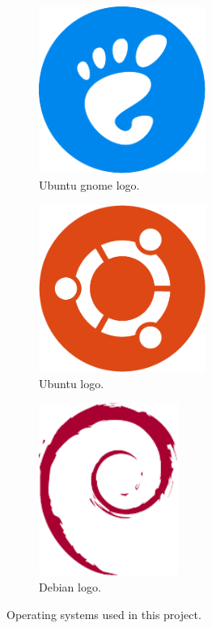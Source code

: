 \begin{figure}[!htbp]
	\centering
	\begin{subfigure}{0.3\textwidth}
		\centering
		\includegraphics[width=0.6\textwidth]{fig/ubuntu-gnome}
		\caption{Ubuntu \acrshort{gnome} logo.}\label{subfig:ubuntu_gnome}
	\end{subfigure}\quad
	\begin{subfigure}{0.3\textwidth}
		\centering
		\includegraphics[width=0.6\textwidth]{fig/ubuntu}
		\caption{Ubuntu logo.}\label{subfig:ubuntu}
	\end{subfigure}\quad
	\begin{subfigure}{0.3\textwidth}
		\centering
		\includegraphics[width=0.5\textwidth]{fig/debian}
		\caption{Debian logo.}\label{subfig:debian}
	\end{subfigure}\quad
	\caption{Operating systems used in this project.}
\end{figure}

